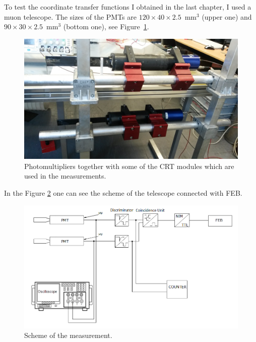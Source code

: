 \documentclass[a4paper]{article}\linespread{1.4}
\begin{document}
To test the coordinate transfer functions I obtained in the last chapter, I used a muon telescope. The sizes of the PMTs are $120\times40\times2.5$~$\mathrm{{mm}^3}$ (upper one) and $90\times30\times2.5$~$\mathrm{{mm}^3}$ (bottom one), see Figure~\ref{fig:2}. \begin{figure}[h!] \centering \includegraphics[width=120mm,scale=1.0]{2.jpg} \caption{Photomultipliers together with some of the CRT modules which are used in the measurements.} \label{fig:2} \end{figure}
In the Figure \ref{fig:scheme} one can see the scheme of the telescope connected with FEB.
\begin{figure}[h!] \centering \includegraphics[width=120mm,scale=1.0]{scheme.png} \caption{Scheme of the measurement.} \label{fig:scheme} \end{figure}  
\end{document}

